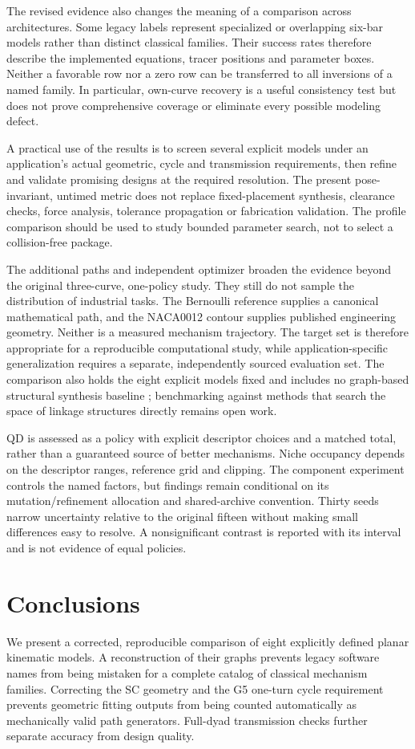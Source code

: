 \documentclass[applsci,article,submit,pdftex,moreauthors]{Definitions/mdpi}
\begin{document}
The revised evidence also changes the meaning of a comparison across architectures. Some legacy labels represent specialized or overlapping six-bar models rather than distinct classical families. Their success rates therefore describe the implemented equations, tracer positions and parameter boxes. Neither a favorable row nor a zero row can be transferred to all inversions of a named family. In particular, own-curve recovery is a useful consistency test but does not prove comprehensive coverage or eliminate every possible modeling defect.

A practical use of the results is to screen several explicit models under an application's actual geometric, cycle and transmission requirements, then refine and validate promising designs at the required resolution. The present pose-invariant, untimed metric does not replace fixed-placement synthesis, clearance checks, force analysis, tolerance propagation or fabrication validation. The profile comparison should be used to study bounded parameter search, not to select a collision-free package.

The additional paths and independent optimizer broaden the evidence beyond the original three-curve, one-policy study. They still do not sample the distribution of industrial tasks. The Bernoulli reference supplies a canonical mathematical path, and the NACA0012 contour supplies published engineering geometry. Neither is a measured mechanism trajectory. The target set is therefore appropriate for a reproducible computational study, while application-specific generalization requires a separate, independently sourced evaluation set. The comparison also holds the eight explicit models fixed and includes no graph-based structural synthesis baseline \cite{Fogelson2023}; benchmarking against methods that search the space of linkage structures directly remains open work.

QD is assessed as a policy with explicit descriptor choices and a matched total, rather than a guaranteed source of better mechanisms. Niche occupancy depends on the descriptor ranges, reference grid and clipping. The component experiment controls the named factors, but findings remain conditional on its mutation/refinement allocation and shared-archive convention. Thirty seeds narrow uncertainty relative to the original fifteen without making small differences easy to resolve. A nonsignificant contrast is reported with its interval and is not evidence of equal policies.

\section{Conclusions}
We present a corrected, reproducible comparison of eight explicitly defined planar kinematic models. A reconstruction of their graphs prevents legacy software names from being mistaken for a complete catalog of classical mechanism families. Correcting the SC geometry and the G5 one-turn cycle requirement prevents geometric fitting outputs from being counted automatically as mechanically valid path generators. Full-dyad transmission checks further separate accuracy from design quality.
\end{document}
